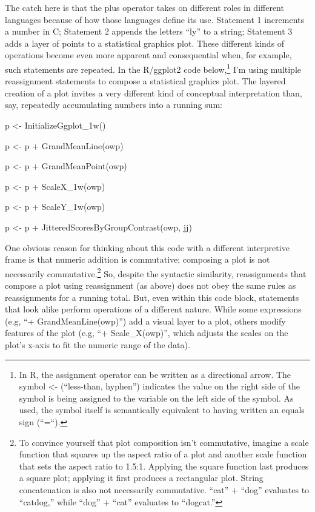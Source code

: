 The catch here is that the plus operator takes on different roles in
different languages because of how those languages define its use.
Statement 1 increments a number in C; Statement 2 appends the letters
``ly'' to a string; Statement 3 adds a layer of points to a statistical
graphics plot. These different kinds of operations become even more
apparent and consequential when, for example, such statements are
repeated. In the R/ggplot2 code below,\footnote{In R, the assignment
  operator can be written as a directional arrow. The symbol
  \textless{}- (``less-than, hyphen'') indicates the value on the right
  side of the symbol is being assigned to the variable on the left side
  of the symbol. As used, the symbol itself is semantically equivalent
  to having written an equals sign (``=``).} I'm using multiple
reassignment statements to compose a statistical graphics plot. The
layered creation of a plot invites a very different kind of conceptual
interpretation than, say, repeatedly accumulating numbers into a running
sum:

p \textless{}- InitializeGgplot\_1w()

p \textless{}- p + GrandMeanLine(owp)

p \textless{}- p + GrandMeanPoint(owp)

p \textless{}- p + ScaleX\_1w(owp)

p \textless{}- p + ScaleY\_1w(owp)

p \textless{}- p + JitteredScoresByGroupContrast(owp, jj)

One obvious reason for thinking about this code with a different
interpretive frame is that numeric addition is commutative; composing a
plot is not necessarily commutative.\footnote{To convince yourself that
  plot composition isn't commutative, imagine a scale function that
  squares up the aspect ratio of a plot and another scale function that
  sets the aspect ratio to 1.5:1. Applying the square function last
  produces a square plot; applying it first produces a rectangular plot.
  String concatenation is also not necessarily commutative. ``cat'' +
  ``dog'' evaluates to ``catdog,'' while ``dog'' + ``cat'' evaluates to
  ``dogcat.''} So, despite the syntactic similarity, reassignments that
compose a plot using reassignment (as above) does not obey the same
rules as reassignments for a running total. But, even within this code
block, statements that look alike perform operations of a different
nature. While some expressions (e.g, ``+ GrandMeanLine(owp)'') add a
visual layer to a plot, others modify features of the plot (e.g, ``+
Scale\_X(owp)'', which adjusts the scales on the plot's x-axis to fit
the numeric range of the data).

